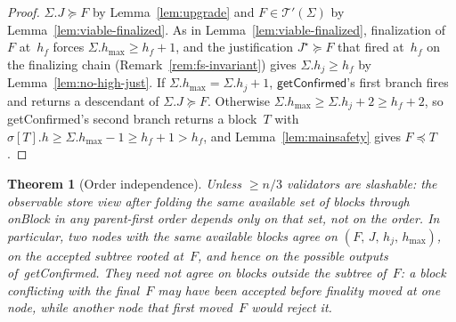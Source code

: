 \ifx\litemode\undefined\documentclass{article}\fi
\newcommand{\hmax}{\ensuremath{h_{\max}}\xspace}
\newcommand{\viableTree}{\ensuremath{\mathcal{T}'}}
\newcommand{\onBlock}{\textsf{onBlock}\xspace}
\newcommand{\getConfirmed}{\textsf{getConfirmed}\xspace}
\theoremstyle{plain}
\newtheorem{theorem}{Theorem}
\theoremstyle{definition}
\theoremstyle{remark}
\begin{document}
\begin{proof}
$\Sigma.J \succeq F$ by Lemma~\ref{lem:upgrade} and $F \in \viableTree(\Sigma)$ by Lemma~\ref{lem:viable-finalized}.
As in Lemma~\ref{lem:viable-finalized}, finalization of~$F$ at~$h_f$ forces $\Sigma.\hmax \geq h_f + 1$, and the justification $J^\star \succeq F$ that fired at~$h_f$ on the finalizing chain (Remark~\ref{rem:fs-invariant}) gives $\Sigma.h_j \geq h_f$ by Lemma~\ref{lem:no-high-just}.
If $\Sigma.\hmax = \Sigma.h_j + 1$, $\getConfirmed$'s first branch fires and returns a descendant of $\Sigma.J \succeq F$.
Otherwise $\Sigma.\hmax \geq \Sigma.h_j + 2 \geq h_f + 2$, so \getConfirmed's second branch returns a block~$T$ with $\sigma[T].h \geq \Sigma.\hmax - 1 \geq h_f + 1 > h_f$, and Lemma~\ref{lem:mainsafety} gives $F \preceq T$.
\end{proof}

\begin{theorem}[Order independence]\label{thm:orderindep}
Unless $\geq n/3$ validators are slashable: the observable store view after folding the same available set of blocks through \onBlock in any parent-first order depends only on that set, not on the order.
In particular, two nodes with the same available blocks agree on $(F,\,J,\,h_j,\,\hmax)$, on the accepted subtree rooted at~$F$, and hence on the possible outputs of~\getConfirmed.
They need not agree on blocks outside the subtree of~$F$: a block conflicting with the final~$F$ may have been accepted before finality moved at one node, while another node that first moved~$F$ would reject it.
\end{theorem}
\end{document}
